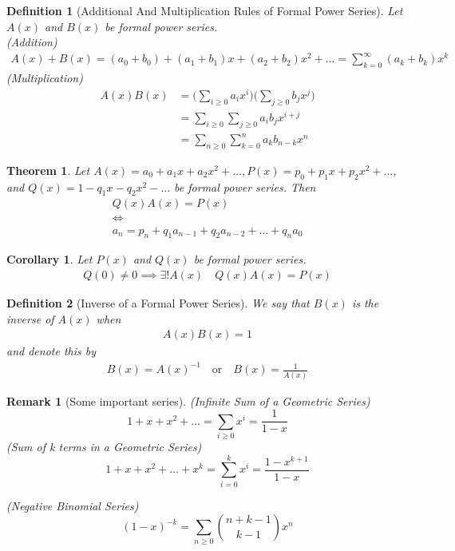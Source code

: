 \documentclass[11pt, oneside]{book}
\theoremstyle{break}
\newtheorem{thm}{Theorem}[section]
\newtheorem{crly}{Corollary}[thm]
\newtheorem{defn}{Definition}[section]
\newtheorem*{remark}{Remark}
\begin{document}
\begin{defn}[Additional And Multiplication Rules of Formal Power Series]
	Let $A(x)$ and $B(x)$ be formal power series. \\
	(Addition)
	\begin{gather*}
		A(x) + B(x) = (a_0 + b_0) + (a_1 + b_1)x + (a_2 + b_2)x^2 + \hdots = \sum_{k = 0}^{\infty}(a_k + b_k)x^k
	\end{gather*}
	(Multiplication)
	\begin{align*}
		A(x)B(x) &= \Bigg(\sum_{i \geq 0}a_ix^i\Bigg)\Bigg(\sum_{j \geq 0}b_jx^j\Bigg) \\
				 &= \sum_{i \geq 0}\sum_{j \geq 0}a_ib_jx^{i+j} \\
				 &= \sum_{n \geq 0}\sum_{k = 0}^{n}a_kb_{n-k}x^n
	\end{align*}
\end{defn}

\begin{thm}
	Let $A(x) = a_0 + a_1x + a_2x^2 + \hdots, P(x) = p_0 + p_1x + p_2x^2 + \hdots$, and $Q(x) = 1 - q_1x - q_2x^2 - \hdots$ be formal power series. Then
	\begin{gather*}
		Q(x)A(x) = P(x) \\
		\iff \\
		a_n = p_n + q_1a_{n-1} + q_2a_{n-2} + \hdots + q_na_0
	\end{gather*}
\end{thm}

\begin{crly}
	Let $P(x)$ and $Q(x)$ be formal power series.
	\begin{gather*}
		Q(0) \neq 0 \implies \exists!A(x) \quad Q(x)A(x) = P(x)
	\end{gather*}
\end{crly}

\begin{defn}[Inverse of a Formal Power Series]
	We say that $B(x)$ is the inverse of $A(x)$ when
	\begin{gather*}
		A(x)B(x) = 1
	\end{gather*}
	and denote this by
	\begin{gather*}
		B(x) = A(x)^{-1} \quad \text{or} \quad B(x) = \frac{1}{A(x)}
	\end{gather*}
\end{defn}

\begin{remark}[Some important series]
	(Infinite Sum of a Geometric Series)
	\[
		1 + x + x^2 + \hdots = \sum_{i \geq 0}x^i = \frac{1}{1-x}
	\]
	(Sum of k terms in a Geometric Series)
	\[
		1 + x + x^2 + \hdots + x^k = \sum_{i=0}^{k} x^i = \frac{1 - x^{k+1}}{1 - x}
	\]

	(Negative Binomial Series)
	\[
		(1-x)^{-k} = \sum_{n \geq 0} \binom{n+k-1}{k-1}x^n
	\]
\end{remark}
\end{document}
